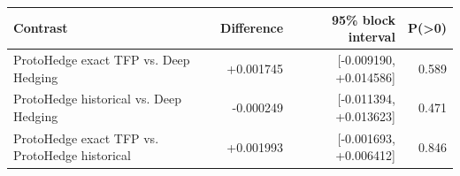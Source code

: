 \begin{tabular}{lrrr}
\toprule
Contrast & Difference & 95\% block interval & P(>0) \\
\midrule
ProtoHedge exact TFP vs. Deep Hedging & +0.001745 & [-0.009190, +0.014586] & 0.589 \\
ProtoHedge historical vs. Deep Hedging & -0.000249 & [-0.011394, +0.013623] & 0.471 \\
ProtoHedge exact TFP vs. ProtoHedge historical & +0.001993 & [-0.001693, +0.006412] & 0.846 \\
\bottomrule
\end{tabular}
